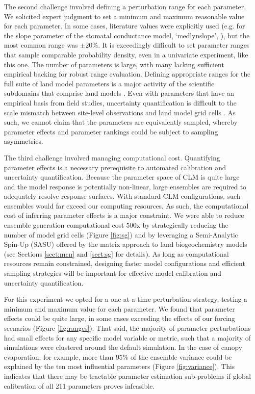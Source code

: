 \documentclass[draft]{agujournal2019}
\begin{document}
The second challenge involved defining a perturbation range for each parameter. We solicited expert judgment to set a minimum and maximum reasonable value for each parameter. In some cases, literature values were explicitly used (e.g. for the slope parameter of the stomatal conductance model, `medlynslope', ), but the most common range was $\pm20\%$. It is exceedingly difficult to set parameter ranges that sample comparable probability density, even in a univariate experiment, like this one. The number of parameters is large, with many lacking sufficient empirical backing for robust range evaluation. Defining appropriate ranges for the full suite of land model parameters is a major activity of the scientific subdomains that comprise land models \cite{kattge2020}. Even with parameters that have an empirical basis from field studies, uncertainty quantification is difficult to the scale mismatch between site-level observations and land model grid cells \cite{liu2021}. As such, we cannot claim that the parameters are equivalently sampled, whereby parameter effects and parameter rankings could be subject to sampling asymmetries.

The third challenge involved managing computational cost. Quantifying parameter effects is a necessary prerequisite to automated calibration and uncertainty quantification. Because the parameter space of CLM is quite large and the model response is potentially non-linear, large ensembles are required to adequately resolve response surfaces. With standard CLM configurations, such ensembles would far exceed our computing resources. As such, the computational cost of inferring parameter effects is a major constraint. We were able to reduce ensemble generation computational cost 500x by strategically reducing the number of model grid cells (Figure \ref{fig:sg}) and by leveraging a Semi-Analytic Spin-Up (SASU) offered by the matrix approach to land biogeochemistry models \cite{lu2020,luo2022,liao2023} (see Sections \ref{sect:mcn} and \ref{sect:sg} for details). As long as computational resources remain constrained, designing faster model configurations and efficient sampling strategies will be important for effective model calibration and uncertainty quantification. 

For this experiment we opted for a one-at-a-time perturbation strategy, testing a minimum and maximum value for each parameter. We found that parameter effects could be quite large, in some cases exceeding the effects of our forcing scenarios (Figure \ref{fig:ranges}). That said, the majority of parameter perturbations had small effects for any specific model variable or metric, such that a majority of simulations were clustered around the default simulation. In the case of canopy evaporation, for example, more than 95\% of the ensemble variance could be explained by the ten most influential parameters (Figure \ref{fig:variance}). This indicates that there may be tractable parameter estimation sub-problems if global calibration of all 211 parameters proves infeasible. 
\end{document}
